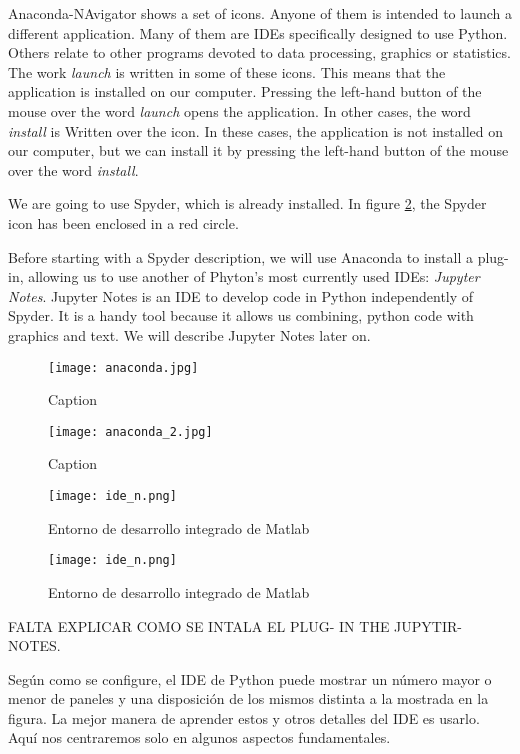 \begin{paracol}{2}
 Anaconda-NAvigator shows a set of icons. Anyone of them is intended to launch a different application. Many of them are IDEs specifically designed to use Python. Others relate to other programs devoted to data processing, graphics or statistics. The work \emph{launch} is written in some of these icons. This means that the application is installed on our computer. Pressing the left-hand button of the mouse over the word \emph{launch} opens the application. In other cases, the word \emph{install} is Written over the icon. In these cases, the application is not installed on our computer, but we can install it by pressing the left-hand button of the mouse over the word \emph{install}.

 We are going to use Spyder, which is already installed. In figure \ref{fig:anaconda}, the Spyder icon has been enclosed in a red circle.

 Before starting with a Spyder description, we will use Anaconda to install a plug-in, allowing us to use another of Phyton's most currently used IDEs: \emph{Jupyter Notes}. Jupyter Notes is an IDE to develop code in Python independently of Spyder. It is a handy tool because it allows us combining, python code with graphics and text. We will describe Jupyter Notes later on.
\end{paracol}
\begin{figure}
    \centering
    \texttt{[image: anaconda.jpg]}
    \caption{Caption}
    \label{fig:anaconda}
\end{figure} 
 
\begin{figure}
    \centering
    \texttt{[image: anaconda\_2.jpg]}
    \caption{Caption}
    \label{fig:anaconda}
\end{figure} 
 
\begin{figure}[h]
	\centering
		\texttt{[image: ide\_n.png]}
	\caption{Entorno de desarrollo integrado de Matlab}
	\label{fig:ide}
\end{figure}




\begin{figure}[h]
	\centering
		\texttt{[image: ide\_n.png]}
	\caption{Entorno de desarrollo integrado de Matlab}
	\label{fig:ide}
\end{figure}
FALTA EXPLICAR COMO SE INTALA EL PLUG-
IN THE JUPYTIR-NOTES.



Según como se configure, el IDE de Python puede mostrar un número mayor o menor de paneles y una disposición de los mismos distinta a la mostrada en la figura. La mejor manera de aprender estos y otros detalles del IDE es usarlo. Aquí nos centraremos solo en algunos aspectos fundamentales.

